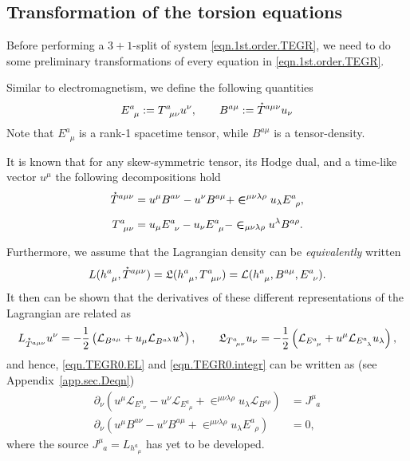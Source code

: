 \documentclass[
10pt, %
a4paper, %
oneside, %
headinclude,footinclude, %
BCOR5mm, %
]{scrartcl}
\newcommand{\tetrsymbol}{h}
\newcommand{\tetr}[2]{\tetrsymbol^{#1}_{\phantom{#1}#2}}
\newcommand{\D}[1]{\partial_{#1}} %
\newcommand{\Tors}[2]{T^{#1}_{\phantom{a}#2}}
\newcommand{\ET}[2]{E^{#1}_{\phantom{#1}#2}}	%
\newcommand{\BT}[2]{B^{#1#2}}	%
\newcommand{\Laghodge}{L}%
\newcommand{\Lagtors}{\mathfrak{L}}%
\newcommand{\LagBE}{\mathcal{L}}%
\newcommand{\LCsymb}{\bm{\in}}    %
\newcommand{\HDT}[1]{\accentset{\star}{T}^{#1}}
\newcommand{\NC}[2]{J^{#2}_{\phantom{#2}#1}}
\begin{document}
\subsection{Transformation of the torsion equations}\label{sec.transform.potential}


Before performing a $ 3+1 $-split \cite{Alcubierre2008} of system \eqref{eqn.1st.order.TEGR}, we 
need to do some preliminary transformations of every equation in \eqref{eqn.1st.order.TEGR}. 


Similar to electromagnetism, we define the following quantities
\begin{equation}
\ET{a}{\mu} := \Tors{a}{\mu\nu} u^\nu, \qquad  \BT{a}{\mu} := \HDT{a\mu\nu} u_\nu
\end{equation}
Note that $ \ET{a}{\mu} $ is a rank-1 spacetime tensor, while $ \BT{a}{\mu} $ is a tensor-density.

It is known that for any skew-symmetric tensor, its Hodge dual, and a time-like vector $ u^\mu $ 
the following 
decompositions hold
\begin{subequations}\label{eqn.T.decompos}
\begin{align}
\HDT{a\mu\nu} &= u^\mu \BT{a}{\nu} - u^\nu \BT{a}{\mu} + 
\LCsymb^{\mu\nu\lambda\rho}u_\lambda 
\ET{a}{\rho},\\[2mm]
\Tors{a}{\mu\nu} &= u_\mu \ET{a}{\nu} - u_\nu \ET{a}{\mu} - 
\LCsymb_{\mu\nu\lambda\rho}u^\lambda 
\BT{a}{\rho}.
\end{align}
\end{subequations}

Furthermore, we assume that the Lagrangian density can be \textit{equivalently} written 
\begin{equation}\label{eqn.Lagrangians2}
\Laghodge(\tetr{a}{\mu},\HDT{a\mu\nu}) = \Lagtors(\tetr{a}{\mu},\Tors{a}{\mu\nu}) = 
\LagBE(\tetr{a}{\mu},\BT{a}{\mu},\ET{a}{\nu}).
\end{equation}
It then can be shown that the derivatives of these different representations of the Lagrangian are related as
\begin{equation}
\Laghodge_{\HDT{a\mu\nu}}u^\nu = -\frac12\left( \LagBE_{\BT{a}{\mu}} +u_\mu 
\LagBE_{\BT{a}{\lambda}} u^\lambda \right), \label{eqn.1st.order.EL}
\qquad 
\Lagtors_{\Tors{a}{\mu\nu}}u_\nu = -\frac12\left( \LagBE_{\ET{a}{\mu}} + u^\mu 
\LagBE_{\ET{a}{\lambda}} u_\lambda \right),
\end{equation}
and hence, \eqref{eqn.TEGR0.EL} and \eqref{eqn.TEGR0.integr} 
can be written as (see Appendix~\eqref{app.sec.Deqn})
\begin{subequations}\label{eqn.tors.BE}
	\begin{align}
		\D{\nu}( u^\mu\LagBE_{\ET{a}{\nu}} - u^\nu \LagBE_{\ET{a}{\mu}} + 
		\LCsymb^{\mu\nu\lambda\rho}u_\lambda\LagBE_{\BT{a}{\rho}}) 
		&= \NC{a}{\mu}\label{eqn.tors.BE.a} \\[2mm]
%		
		\D{\nu}(u^\mu \BT{a}{\nu} - u^\nu\BT{a}{\mu} + 
		\LCsymb^{\mu\nu\lambda\rho}u_\lambda\ET{a}{\rho}) &= 0,
	\end{align}
\end{subequations}
where the source $ \NC{a}{\mu} = \Laghodge_{\tetr{a}{\mu}} $ has yet to be developed.
\end{document}
